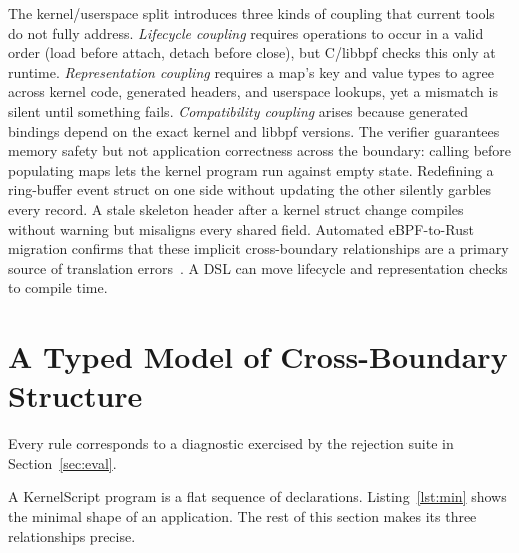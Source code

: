 \documentclass[sigplan,10pt,nonacm]{acmart}
\newcommand{\tool}{KernelScript}
\newcommand{\code}[1]{\texttt{\detokenize{#1}}}
\begin{document}
The kernel/userspace split introduces three kinds of coupling that current tools do not fully address.
\emph{Lifecycle coupling} requires operations to occur in a valid order (load before attach, detach before close), but C/libbpf checks this only at runtime.
\emph{Representation coupling} requires a map's key and value types to agree across kernel code, generated headers, and userspace lookups, yet a mismatch is silent until something fails.
\emph{Compatibility coupling} arises because generated bindings depend on the exact kernel and libbpf versions.
The verifier guarantees memory safety but not application correctness across the boundary: calling \code{attach} before populating maps lets the kernel program run against empty state. Redefining a ring-buffer event struct on one side without updating the other silently garbles every record. A stale skeleton header after a kernel struct change compiles without warning but misaligns every shared field.
Automated eBPF-to-Rust migration confirms that these implicit cross-boundary relationships are a primary source of translation errors~\cite{heimdall}.
A DSL can move lifecycle and representation checks to compile time.

\section{A Typed Model of Cross-Boundary Structure}
\label{sec:model}

Every rule corresponds to a diagnostic exercised by the rejection suite in Section~\ref{sec:eval}.

A \tool{} program is a flat sequence of declarations.
Listing~\ref{lst:min} shows the minimal shape of an application. The rest of this section makes its three relationships precise.
\end{document}
